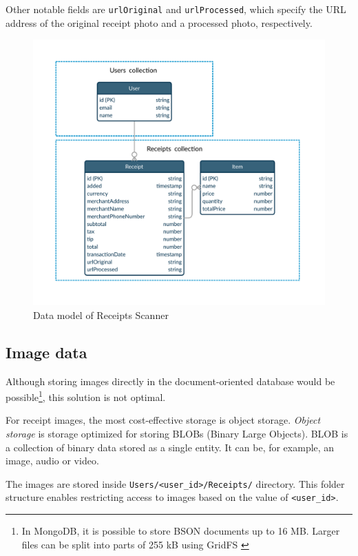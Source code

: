 \documentclass[
  digital, %
  table,   %
  oneside, %
  lof,     %
  lot,     %
]{fithesis3}
\newcommand{\definition}[1]{\textit{#1}}
\begin{document}
Other notable fields are \texttt{urlOriginal} and \texttt{urlProcessed}, which specify the URL address of the original receipt photo and a processed photo, respectively. 

    \begin{figure}
        \begin{center}
            \includegraphics[width=\textwidth]{figures/other/data_model_firestore}
        \end{center}
        \caption{Data model of Receipts Scanner}
        \label{fig:data_model_firestore}
    \end{figure}

\subsection{Image data}
Although storing images directly in the document-oriented database would be possible\footnote{In MongoDB, it is possible to store BSON documents up to 16 MB. Larger files can be split into parts of 255 kB using GridFS \cite{GridFS}}, this solution is not optimal.

For receipt images, the most cost-effective storage is object storage. \definition{Object storage} is storage optimized for storing BLOBs (Binary Large Objects). BLOB is a collection of binary data stored as a single entity. It can be, for example, an image, audio or video. 

The images are stored inside \texttt{Users/<user\_id>/Receipts/} directory. This folder structure enables restricting access to images based on the value of \texttt{<user\_id>}.
\end{document}
